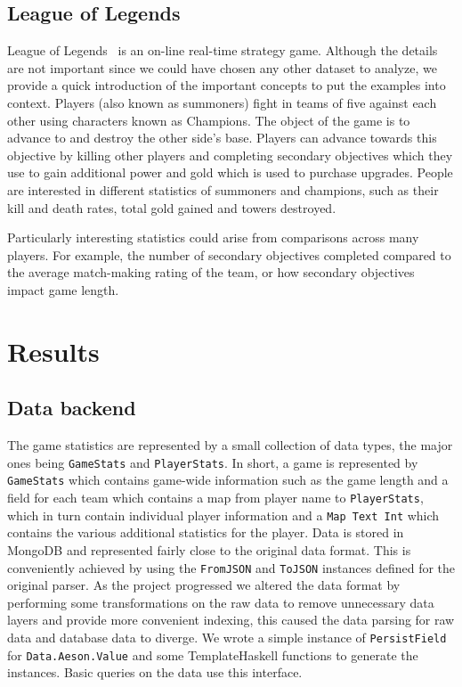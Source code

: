 \documentclass[letterpaper,twocolumn,9pt]{article}
\newcommand{\code}[1]{\texttt{#1}}
\begin{document}
\subsection{League of Legends}

League of Legends~\cite{lol} is an on-line real-time strategy game. Although the details are not important since we could have chosen any other dataset to analyze, we provide a quick introduction of the important concepts to put the examples into context. Players (also known as summoners) fight in teams of five against each other using characters known as Champions. The object of the game is to advance to and destroy the other side's base. Players can advance towards this objective by killing other players and completing secondary objectives which they use to gain additional power and gold which is used to purchase upgrades. People are interested in different statistics of summoners and champions, such as their kill and death rates, total gold gained and towers destroyed.

Particularly interesting statistics could arise from comparisons across many players.  For example, the number of secondary objectives completed compared to the average match-making rating of the team, or how secondary objectives impact game length.

\section{Results}
\label{results}

\subsection{Data backend}

The game statistics are represented by a small collection of data types, the major ones being \code{GameStats} and \code{PlayerStats}.  In short, a game is represented by \code{GameStats} which contains game-wide information such as the game length and a field for each team which contains a map from player name to \code{PlayerStats}, which in turn contain individual player information and a \code{Map Text Int} which contains the various additional statistics for the player.  Data is stored in MongoDB and represented fairly close to the original data format.  This is conveniently achieved by using the \code{FromJSON} and \code{ToJSON} instances defined for the original parser.  As the project progressed we altered the data format by performing some transformations on the raw data to remove unnecessary data layers and provide more convenient indexing, this caused the data parsing for raw data and database data to diverge.  We wrote a simple instance of \code{PersistField} for \code{Data.Aeson.Value} and some TemplateHaskell functions to generate the instances.  Basic queries on the data use this interface.
\end{document}
